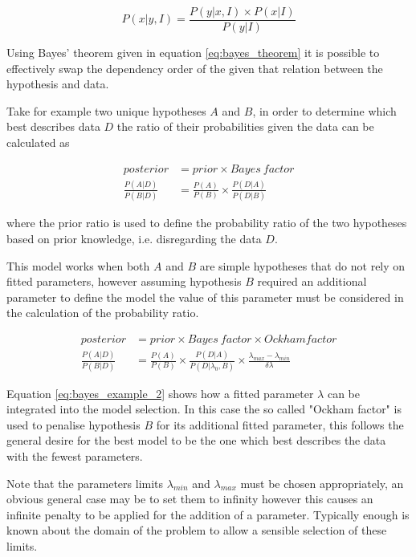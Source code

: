 \documentclass[a4paper]{article}
\begin{document}
\begin{equation}
  \label{eq:bayes_theorem}
  P(x | y, I) = \frac{P(y | x, I) \times P(x | I)}{P(y | I)}
\end{equation}

Using Bayes' theorem given in equation \ref{eq:bayes_theorem} it is possible to
effectively swap the dependency order of the given that relation between the
hypothesis and data. \cite{Sivia1993}

Take for example two unique hypotheses $A$ and $B$, in order to determine which
best describes data $D$ the ratio of their probabilities given the data can be
calculated as

\begin{align}
  \label{eq:bayes_example_1}
              posterior &= prior \times Bayes \: factor \\
  \frac{P(A|D)}{P(B|D)} &= \frac{P(A)}{P(B)} \times \frac{P(D|A)}{P(D|B)}
\end{align}

where the prior ratio is used to define the probability ratio of the two
hypotheses based on prior knowledge, i.e. disregarding the data $D$.

This model works when both $A$ and $B$ are simple hypotheses that do not rely on
fitted parameters, however assuming hypothesis $B$ required an additional
parameter to define the model the value of this parameter must be considered in
the calculation of the probability ratio.

\begin{align}
  \label{eq:bayes_example_2}
  posterior &= prior \times Bayes \: factor \times Ockham factor \\
  \frac{P(A|D)}{P(B|D)} &=
    \frac{P(A)}{P(B)} \times
    \frac{P(D|A)}{P(D|\lambda_{0}, B)} \times
    \frac{\lambda_{max} - \lambda_{min}}{\delta\lambda}
\end{align}

Equation \ref{eq:bayes_example_2} \cite{Sivia1993} shows how a fitted parameter
$\lambda$ can be integrated into the model selection. In this case the so called
"Ockham factor" is used to penalise hypothesis $B$ for its additional fitted
parameter, this follows the general desire for the best model to be the one
which best describes the data with the fewest parameters.

Note that the parameters limits $\lambda_{min}$ and $\lambda_{max}$ must be
chosen appropriately, an obvious general case may be to set them to infinity
however this causes an infinite penalty to be applied for the addition of a
parameter. Typically enough is known about the domain of the problem to allow a
sensible selection of these limits.
\end{document}
